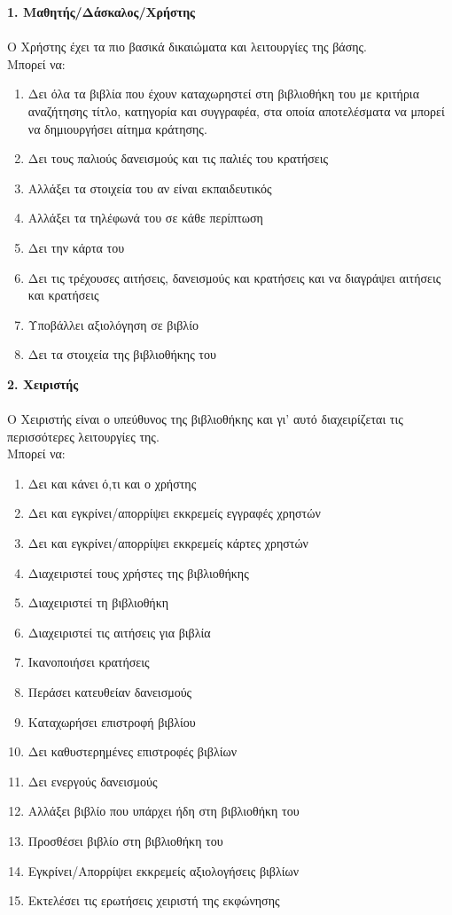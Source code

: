\documentclass[14pt]{report}
\begin{document}
	\newpage
	\hypertarget{studentanchor}{}
	\textbf{1. Μαθητής/Δάσκαλος/Χρήστης} \\ \\ 
	Ο Χρήστης έχει τα πιο βασικά δικαιώματα και λειτουργίες της βάσης. \\
	Μπορεί να:
	\begin{enumerate}[label=\alph*)]
		\item Δει όλα τα βιβλία που έχουν καταχωρηστεί στη βιβλιοθήκη του με κριτήρια αναζήτησης τίτλο, κατηγορία και συγγραφέα, στα οποία αποτελέσματα να μπορεί να δημιουργήσει αίτημα κράτησης.
		\item Δει τους παλιούς δανεισμούς και τις παλιές του κρατήσεις
		\item Αλλάξει τα στοιχεία του αν είναι εκπαιδευτικός
		\item Αλλάξει τα τηλέφωνά του σε κάθε περίπτωση
		\item Δει την κάρτα του
		\item Δει τις τρέχουσες αιτήσεις, δανεισμούς και κρατήσεις και να διαγράψει αιτήσεις και κρατήσεις
		\item Υποβάλλει αξιολόγηση σε βιβλίο
		\item Δει τα στοιχεία της βιβλιοθήκης του
	\end{enumerate}
	\newpage
	\hypertarget{operatoranchor}{}
	\textbf{2. Χειριστής} \\ \\ 
	Ο Χειριστής είναι ο υπεύθυνος της βιβλιοθήκης και γι' αυτό διαχειρίζεται τις περισσότερες λειτουργίες της. \\
	Μπορεί να:
	\begin{enumerate}[label=\alph*)]
		\item Δει και κάνει ό,τι και ο χρήστης
		\item Δει και εγκρίνει/απορρίψει εκκρεμείς εγγραφές χρηστών
		\item Δει και εγκρίνει/απορρίψει εκκρεμείς κάρτες χρηστών
		\item Διαχειριστεί τους χρήστες της βιβλιοθήκης
		\item Διαχειριστεί τη βιβλιοθήκη
		\item Διαχειριστεί τις αιτήσεις για βιβλία
		\item Ικανοποιήσει κρατήσεις
		\item Περάσει κατευθείαν δανεισμούς
		\item Καταχωρήσει επιστροφή βιβλίου
		\item Δει καθυστερημένες επιστροφές βιβλίων
		\item Δει ενεργούς δανεισμούς
		\item Αλλάξει βιβλίο που υπάρχει ήδη στη βιβλιοθήκη του
		\item Προσθέσει βιβλίο στη βιβλιοθήκη του
		\item Εγκρίνει/Απορρίψει εκκρεμείς αξιολογήσεις βιβλίων
		\item Εκτελέσει τις ερωτήσεις χειριστή της εκφώνησης
	\end{enumerate}
\end{document}
